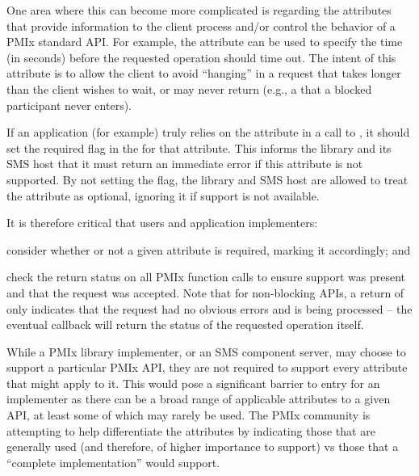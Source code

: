 One area where this can become more complicated is regarding the attributes that provide information to the client process and/or control the behavior of a \ac{PMIx} standard \ac{API}. For example, the  attribute can be used to specify the time (in seconds) before the requested operation should time out. The intent of this attribute is to allow the client to avoid ``hanging'' in a request that takes longer than the client wishes to wait, or may never return (e.g., a  that a blocked participant never enters).


If an application (for example) truly relies on the  attribute in a call to , it should set the required flag in the  for that attribute. This informs the library and its \ac{SMS} host that it must return an immediate error if this attribute is not supported. By not setting the flag, the library and \ac{SMS} host are allowed to treat the attribute as optional, ignoring it if support is not available.

It is therefore critical that users and application implementers:

\begin{compactalphaenum}
\item consider whether or not a given attribute is required, marking it accordingly; and

\item check the return status on all \ac{PMIx} function calls to ensure support was present and that the request was accepted. Note that for non-blocking \acp{API}, a return of  only indicates that the request had no obvious errors and is being processed – the eventual callback will return the status of the requested operation itself.
\end{compactalphaenum}


While a \ac{PMIx} library implementer, or an \ac{SMS} component server, may choose to support a particular \ac{PMIx} \ac{API}, they are not required to support every attribute that might apply to it. This would pose a significant barrier to entry for an implementer as there can be a broad range of applicable attributes to a given \ac{API}, at least some of which may rarely be used. The \ac{PMIx} community is attempting to help differentiate the attributes by indicating those that are generally used (and therefore, of higher importance to support) vs those that a ``complete implementation'' would support.

